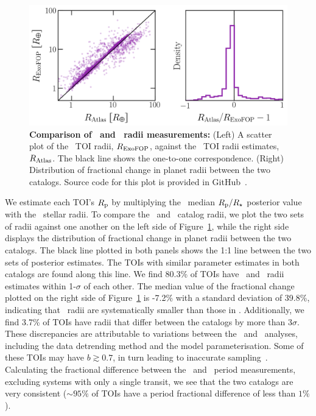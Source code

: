 \documentclass[floatfix,ApJL,twocolumn]{aastex631}
\begin{document}
\begin{figure}\label{fig:frac_diff}
  \includegraphics[width=\linewidth]{figures/radius_error.png}
  \caption{\textbf{Comparison of \exofop\ and \tessAtlas\ radii measurements:} (Left) A scatter plot of the \exofop\ TOI radii, $R_{\rm ExoFOP}$, against the \tessAtlas\ TOI radii estimates, $R_{\rm Atlas}$.
  The black line shows the one-to-one correspondence.
  (Right) Distribution of fractional change in planet radii between the two catalogs.
  Source code for this plot is provided in GitHub~\paperPlotsLink.
  }
\end{figure}

We estimate each TOI's $R_{\rm p}$ by multiplying the \tessAtlas\  median $R_{\rm p}/R_{\star}$ posterior value with the \mast\ stellar radii.
To compare the \tessAtlas\  and \exofop\ catalog radii, we plot the two sets of radii against one another on the left side of Figure~\ref{fig:frac_diff}, while the right side displays the distribution of fractional change in planet radii between the two catalogs.
The black line plotted in both panels shows the 1:1 line between the two sets of posterior estimates.
The TOIs with similar parameter estimates in both catalogs are found along this line.
We find 80.3\% of TOIs have \tessAtlas\ and \exofop\ radii estimates within 1-$\sigma$ of each other.
The median value of the fractional change plotted on the right side of  Figure~\ref{fig:frac_diff} is -7.2\% with a standard deviation of 39.8\%, indicating that \tessAtlas\ radii are systematically smaller than those in \exofop.
Additionally, we find 3.7\% of TOIs have radii that differ between the catalogs by more than $3\sigma$.
These discrepancies are attributable to variations between the \tessAtlas\ and \exofop\ analyses, including the data detrending method  and the model parameterisation.
Some of these TOIs may have $b\gtrsim0.7$, in turn leading to inaccurate sampling~\citep[see e.g.][]{Thompson:2018:ApJS, Gilbert:2022:AJ}.
Calculating the fractional difference between the \exofop\ and \tessAtlas\ period measurements, excluding systems with only a single transit, we see that the two catalogs are very consistent ($\sim95\%$ of TOIs have a period fractional difference of less than $1\%$).
\end{document}
